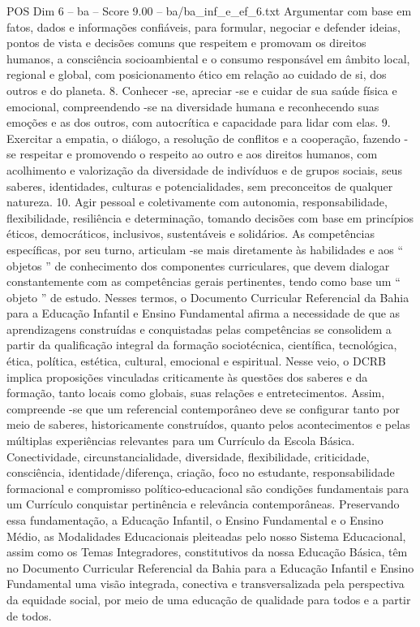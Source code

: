 \begin{textsample}{POS Dim 6 – ba – Score 9.00 – ba/ba\_inf\_e\_ef\_6.txt}
Argumentar com base em fatos, dados e informações confiáveis, para formular, negociar e defender ideias, pontos de vista e decisões comuns que respeitem e promovam os direitos humanos, a consciência socioambiental e o consumo responsável em âmbito local, regional e global, com posicionamento ético em relação ao cuidado de si, dos outros e do planeta. 8.
Conhecer -se, apreciar -se e cuidar de sua saúde física e emocional, compreendendo -se na diversidade humana e reconhecendo suas emoções e as dos outros, com autocrítica e capacidade para lidar com elas. 9.
Exercitar a empatia, o diálogo, a resolução de conflitos e a cooperação, fazendo -se respeitar e promovendo o respeito ao outro e aos direitos humanos, com acolhimento e valorização da diversidade de indivíduos e de grupos sociais, seus saberes, identidades, culturas e potencialidades, sem preconceitos de qualquer natureza. 10.
Agir pessoal e coletivamente com autonomia, responsabilidade, flexibilidade, resiliência e determinação, tomando decisões com base em princípios éticos, democráticos, inclusivos, sustentáveis e solidários.
As competências específicas, por seu turno, articulam -se mais diretamente às habilidades e aos “ objetos ” de conhecimento dos componentes curriculares, que devem dialogar constantemente com as competências gerais pertinentes, tendo como base um “ objeto ” de estudo.
Nesses termos, o Documento Curricular Referencial da Bahia para a Educação Infantil e Ensino Fundamental afirma a necessidade de que as aprendizagens construídas e conquistadas pelas competências se consolidem a partir da qualificação integral da formação sociotécnica, científica, tecnológica, ética, política, estética, cultural, emocional e espiritual.
Nesse veio, o DCRB implica proposições vinculadas criticamente às questões dos saberes e da formação, tanto locais como globais, suas relações e entretecimentos.
Assim, compreende -se que um referencial contemporâneo deve se configurar tanto por meio de saberes, historicamente construídos, quanto pelos acontecimentos e pelas múltiplas experiências relevantes para um Currículo da Escola Básica.
Conectividade, circunstancialidade, diversidade, flexibilidade, criticidade, consciência, identidade/diferença, criação, foco no estudante, responsabilidade formacional e compromisso político-educacional são condições fundamentais para um Currículo conquistar pertinência e relevância contemporâneas.
Preservando essa fundamentação, a Educação Infantil, o Ensino Fundamental e o Ensino Médio, as Modalidades Educacionais pleiteadas pelo nosso Sistema Educacional, assim como os Temas Integradores, constitutivos da nossa Educação Básica, têm no Documento Curricular Referencial da Bahia para a Educação Infantil e Ensino Fundamental uma visão integrada, conectiva e transversalizada pela perspectiva da equidade social, por meio de uma educação de qualidade para todos e a partir de todos.

\end{textsample}
